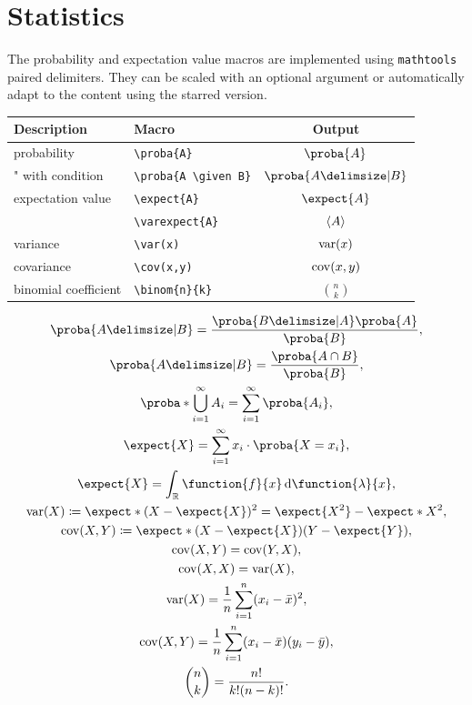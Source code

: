 \documentclass[DIV=13]{scrartcl}
\begin{document}
\section{Statistics}
The probability and expectation value macros are implemented using
\texttt{mathtools} paired delimiters. They can be scaled with an optional
argument or automatically adapt to the content using the starred version.
\begin{center}
  \begin{tabular}{llc}
    \toprule
    \textbf{Description} & \textbf{Macro}            & \textbf{Output}      \\
    \midrule
    probability          & \verb|\proba{A}|          & $\proba{A}$          \\
    " with condition     & \verb|\proba{A \given B}| & $\proba{A \given B}$ \\
    \midrule
    expectation value    & \verb|\expect{A}|         & $\expect{A}$         \\
                         & \verb|\varexpect{A}|      & $\langle A\rangle$      \\
    variance             & \verb|\var(x)|            & $\operatorname{var}(x)$            \\
    covariance           & \verb|\cov(x,y)|          & $\operatorname{cov}(x,y)$          \\
    \midrule
    binomial coefficient & \verb|\binom{n}{k}|       & $\binom{n}{k}$       \\
    \bottomrule
  \end{tabular}
\end{center}
\begin{gather}
  \proba{A\given B} = \frac{\proba{B\given A}\proba{A}}{\proba{B}}, \\
  \proba{A\given B} = \frac{\proba{A\cap B}}{\proba{B}}, \\
  \proba*{\bigcup_{i=1}^\infty A_i} = \sum_{i=1}^\infty\proba{A_i}, \\
  \expect{X} = \sum_{i=1}^\infty x_i\cdot\proba{X=x_i}, \\
  \expect{X} = \int_{\Rnums}\function{f}{x}\diff\function{\lambda}{x}, \\
  \var(X) \coloneq \expect*{(X-\expect{X})^2} = \expect{X^2}-\expect*{X}^2, \\
  \cov(X, Y) \coloneq \expect*{(X-\expect{X})(Y-\expect{Y})}, \\
  \cov(X, Y) = \cov(Y, X), \\
  \cov(X, X) = \var(X), \\
  \var(X) = \frac{1}{n}\sum_{i=1}^n(x_i - \bar{x})^2,\\
  \cov(X,Y) = \frac{1}{n}\sum_{i=1}^n(x_i - \bar{x})(y_i - \bar{y}), \\
  \binom{n}{k} = \frac{n!}{k!(n-k)!}.
\end{gather}
\end{document}
